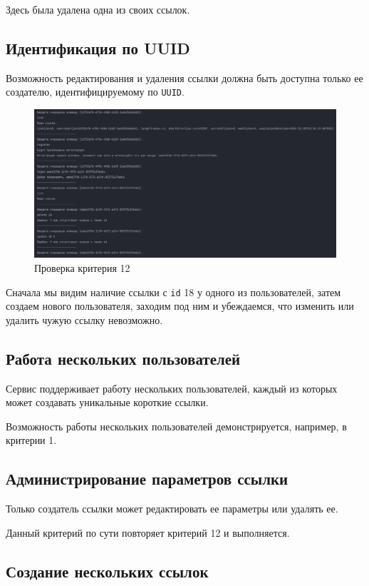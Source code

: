\documentclass[a4paper, 14pt]{article}
\begin{document}
Здесь была удалена одна из своих ссылок.

\subsection{Идентификация по UUID}

Возможность редактирования и удаления ссылки должна быть доступна только ее создателю, идентифицируемому по \texttt{UUID}.

\begin{figure}[H]
	\centering
	\includegraphics[width=17cm]{resources/14.png}
	\caption{Проверка критерия 12}
\end{figure}

Сначала мы видим наличие ссылки с \texttt{id} 18 у одного из пользователей, затем создаем нового пользователя, заходим под ним и убеждаемся, что изменить или удалить чужую ссылку невозможно.

\subsection{Работа нескольких пользователей}

Сервис поддерживает работу нескольких пользователей, каждый из которых может создавать уникальные короткие ссылки.

Возможность работы нескольких пользователей демонстрируется, например, в критерии 1.

\subsection{Администрирование параметров ссылки}

Только создатель ссылки может редактировать ее параметры или удалять ее.

Данный критерий по сути повторяет критерий 12 и выполняется.

\subsection{Создание нескольких ссылок}
\end{document}
